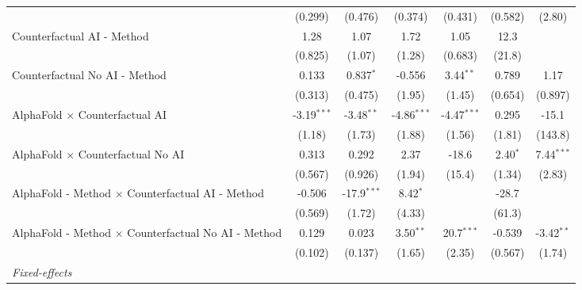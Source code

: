 \begin{tabular}{lcccccc}
                                                              & (0.299)       & (0.476)       & (0.374)       & (0.431)       & (0.582)      & (2.80)\\   
   Counterfactual AI - Method                                 & 1.28          & 1.07          & 1.72          & 1.05          & 12.3         &   \\   
                                                              & (0.825)       & (1.07)        & (1.28)        & (0.683)       & (21.8)       &   \\   
   Counterfactual No AI - Method                              & 0.133         & 0.837$^{*}$   & -0.556        & 3.44$^{**}$   & 0.789        & 1.17\\   
                                                              & (0.313)       & (0.475)       & (1.95)        & (1.45)        & (0.654)      & (0.897)\\   
   AlphaFold $\times$ Counterfactual AI                       & -3.19$^{***}$ & -3.48$^{**}$  & -4.86$^{***}$ & -4.47$^{***}$ & 0.295        & -15.1\\   
                                                              & (1.18)        & (1.73)        & (1.88)        & (1.56)        & (1.81)       & (143.8)\\   
   AlphaFold $\times$ Counterfactual No AI                    & 0.313         & 0.292         & 2.37          & -18.6         & 2.40$^{*}$   & 7.44$^{***}$\\   
                                                              & (0.567)       & (0.926)       & (1.94)        & (15.4)        & (1.34)       & (2.83)\\   
   AlphaFold - Method $\times$ Counterfactual AI - Method     & -0.506        & -17.9$^{***}$ & 8.42$^{*}$    &               & -28.7        &   \\   
                                                              & (0.569)       & (1.72)        & (4.33)        &               & (61.3)       &   \\   
   AlphaFold - Method $\times$ Counterfactual No AI - Method  & 0.129         & 0.023         & 3.50$^{**}$   & 20.7$^{***}$  & -0.539       & -3.42$^{**}$\\   
                                                              & (0.102)       & (0.137)       & (1.65)        & (2.35)        & (0.567)      & (1.74)\\   
   \midrule
   \emph{Fixed-effects}\\

\end{tabular}

